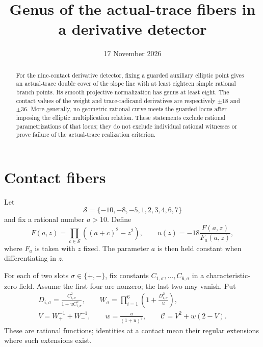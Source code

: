 \documentclass[11pt,a4paper]{article}
\title{Genus of the actual-trace fibers in a derivative detector}
\author{}\date{17 November 2026}
\begin{document}
\maketitle

\begin{abstract}
For the nine-contact derivative detector, fixing a guarded auxiliary
elliptic point gives an actual-trace double cover of the slope line
with at least eighteen simple rational branch points. Its smooth
projective normalization has genus at least eight. The contact
values of the weight and trace-radicand derivatives are respectively
$\pm18$ and $\pm36$. More generally, no geometric rational curve
meets the guarded locus after imposing the elliptic multiplication
relation. These statements exclude rational parametrizations of
that locus; they do not exclude individual rational witnesses or
prove failure of the actual-trace realization criterion.
\end{abstract}

\section{Contact fibers}

Let
\[
                \mathcal S=\{-10,-8,-5,1,2,3,4,6,7\}
\]
and fix a rational number $a>10$. Define
\begin{equation}\label{eq:contact}
 F(a,z)=\prod_{c\in\mathcal S}((a+c)^2-z^2),\qquad
                 u(z)=-18\frac{F(a,z)}{F_a(a,z)},
\end{equation}
where $F_a$ is taken with $z$ fixed. The parameter $a$ is then held
constant when differentiating in $z$.

For each of two slots $\sigma\in\{+,-\}$, fix constants
$C_{1,\sigma},\ldots,C_{6,\sigma}$ in a characteristic-zero field.
Assume the first four are nonzero; the last two may vanish. Put
\begin{equation}\label{eq:detector}
 \begin{gathered}
 D_{i,\sigma}=\frac{C_{i,\sigma}^2}{1+uC_{i,\sigma}^2},\qquad
 W_\sigma=\prod_{i=1}^6\left(1+\frac{D_{i,\sigma}^2}{u}\right),\\
 V=W_+^{-1}+W_-^{-1},\qquad
 w=\frac{u}{(1+u)^2},\qquad
                     \mathcal C=V^2+w(2-V).
 \end{gathered}
\end{equation}
These are rational functions; identities at a contact mean their
regular extensions where such extensions exist.
\end{document}
